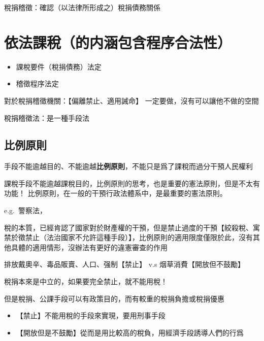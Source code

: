 \documentclass[]{ctexbook}
\providecommand{\tightlist}{%
  \setlength{\itemsep}{0pt}\setlength{\parskip}{0pt}}
\begin{document}
稅捐稽徵：確認（以法律所形成之）稅捐債務關係

\hypertarget{ux4f9dux6cd5ux8ab2ux7a05ux7684ux5185ux6db5ux5305ux542bux7a0bux5e8fux5408ux6cd5ux6027}{%
\section{\texorpdfstring{\textbf{依法課稅}（的内涵包含程序合法性）}{依法課稅（的内涵包含程序合法性）}}\label{ux4f9dux6cd5ux8ab2ux7a05ux7684ux5185ux6db5ux5305ux542bux7a0bux5e8fux5408ux6cd5ux6027}}

\begin{itemize}
\tightlist
\item
  課稅要件（稅捐債務）法定
\item
  稽徵程序法定
\end{itemize}

對於稅捐稽徵機關：【偏離禁止、適用誡命】
一定要做，沒有可以讓他不做的空間

稅捐稽徵法：是一種手段法

\hypertarget{ux6bd4ux4f8bux539fux5247}{%
\subsection{比例原則}\label{ux6bd4ux4f8bux539fux5247}}

手段不能逾越目的、不能逾越\textbf{比例原則}，不能只是爲了課稅而過分干預人民權利

課稅手段不能逾越課稅目的，比例原則的思考，也是重要的憲法原則，但是不太有功能！
比例原則，在一般的干預行政法體系中，是最重要的憲法原則。

e.g.~警察法，

稅的本質，已經肯認了國家對於財產權的干預，但是禁止過度的干預【絞殺稅、寓禁於徵禁止（法治國家不允許這種手段）】，比例原則的適用限度僅限於此，沒有其他具體的適用情形，沒辦法有更好的違憲審查的作用

排放戴奧辛、毒品販賣、人口、强制【禁止】
v.s
烟草消費【開放但不鼓勵】

稅捐本來是中立的，如果要完全禁止，就不能用稅！

但是稅捐、公課手段可以有政策目的，而有較重的稅捐負擔或稅捐優惠

\begin{itemize}
\tightlist
\item
  【禁止】不能用稅的手段來實現，要用刑事手段
\item
  【開放但是不鼓勵】從而是用比較高的稅負，用經濟手段誘導人們的行爲
\end{itemize}
\end{document}
